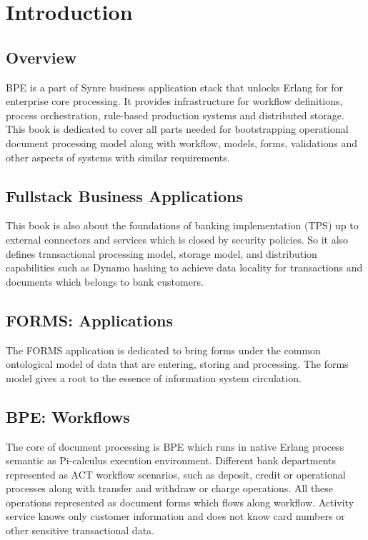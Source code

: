 \section{Introduction}

\subsection{Overview}
BPE is a part of Synrc business application stack that
unlocks Erlang for for enterprise core processing.
It provides infrastructure for workflow definitions, process orchestration,
rule-based production systems and distributed storage. This book is dedicated to cover
all parts needed for bootstrapping operational document processing model along with
workflow, models, forms, validations and other aspects of systems with similar requirements.

\subsection{Fullstack Business Applications}
This book is also about the foundations of banking implementation (TPS) up to external
connectors and services which is closed by security policies. So it also defines
transactional processing model, storage model, and distribution capabilities such as
Dynamo hashing to achieve data locality for transactions and documents which
belongs to bank customers.

\subsection{FORMS: Applications}
The FORMS application is dedicated to bring forms under the common
ontological model of data that are entering, storing and processing.
The forms model gives a root to the essence of information system circulation.

\subsection{BPE: Workflows}
The core of document processing is BPE which runs in native Erlang process semantic
as Pi-calculus execution environment. Different bank departments represented
as ACT workflow scenarios, such as deposit, credit or operational processes along with
transfer and withdraw or charge operations. All these operations represented
as document forms which flows along workflow. Activity service knows only
customer information and does not know card numbers or other sensitive transactional data.

